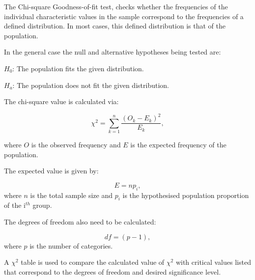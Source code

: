 \documentclass[
]{book}
\begin{document}
The Chi-square Goodness-of-fit test, checks whether the frequencies of the individual characteristic values in the sample correspond to the frequencies of a defined distribution. In most cases, this defined distribution is that of the population.

In the general case the null and alternative hypotheses being tested are:

\(H_0\): The population fits the given distribution.

\(H_a\): The population does not fit the given distribution.

The chi-square value is calculated via:

\[\chi^2=\sum_{k=1}^{n}\frac{(O_k-E_k)^2}{E_k},\]

where \(O\) is the observed frequency and \(E\) is the expected frequency of the population.

The expected value is given by:

\[E=np_i,\]
where \(n\) is the total sample size and \(p_i\) is the hypothesised population proportion of the i\(^{th}\) group.

The degrees of freedom also need to be calculated:

\[df=(p-1),\]
where \(p\) is the number of categories.

A \(\chi^2\) table is used to compare the calculated value of \(\chi^2\) with critical values listed that correspond to the degrees of freedom and desired significance level.
\end{document}
